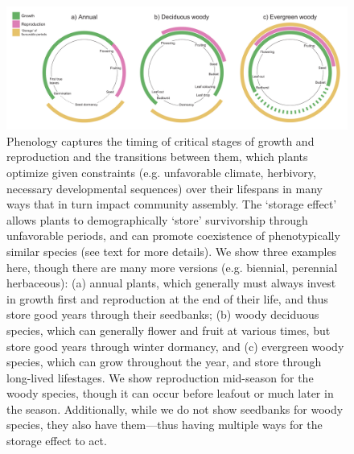\documentclass[11pt]{article}
\begin{document}
\begin{figure}[h!]
\centering
\includegraphics[width=1\textwidth]{..//figures/figsubmit/phenologycircles_2023.1.13.pdf}
\caption{Phenology captures the timing of critical stages of growth and reproduction and the transitions between them, which plants optimize given constraints (e.g. unfavorable climate, herbivory, necessary developmental sequences) over their lifespans in many ways that in turn impact community assembly. The `storage effect' allows plants to demographically  `store' survivorship through unfavorable periods, and can promote coexistence of phenotypically similar species (see text for more details). We show three examples here, though there are many more versions (e.g. biennial, perennial herbaceous): (a) annual plants, which generally must always invest in growth first and reproduction at the end of their life, and thus store good years through their seedbanks; (b) woody deciduous species, which can generally flower and fruit at various times, but store good years through winter dormancy, and (c) evergreen woody species, which can grow throughout the year, and store through long-lived lifestages. We show reproduction mid-season for the woody species, though it can occur before leafout or much later in the season. Additionally, while we do not show seedbanks for woody species, they also have them---thus having multiple ways for the storage effect to act.}
 \label{fig:phenologycircles}
\end{figure}

\clearpage
\end{document}
